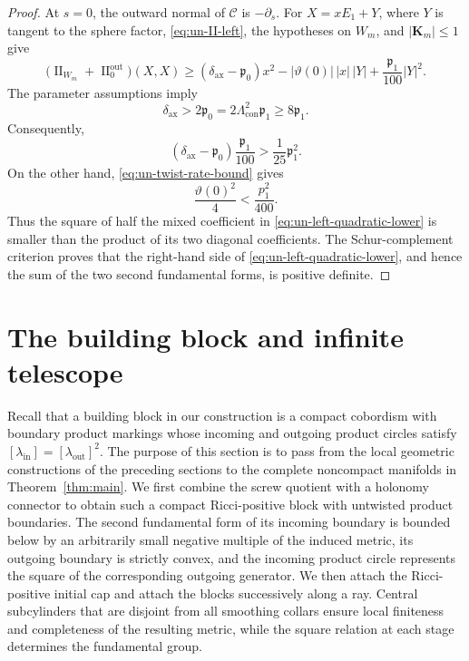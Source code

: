 \documentclass[11pt,reqno]{amsart}
\theoremstyle{definition}
\numberwithin{equation}{section}
\DeclareMathOperator{\II}{II}
\begin{document}
\begin{proof}
At \(s=0\), the outward normal of $\mathcal C$ is \(-\partial_s\).
For \(X=xE_1+Y\), where \(Y\) is tangent to the sphere factor,
\eqref{eq:un-II-left}, the hypotheses on \(W_m\), and
\(|\mathbf K_m|\le1\) give
\begin{equation}
 \bigl(\II_{W_m}+\II^{\mathrm{out}}_0\bigr)(X,X)
 \ge
 (\delta_{\mathrm{ax}}-\mathfrak p_0)x^2
 -|\vartheta(0)|\,|x|\,|Y|
 +\frac{\mathfrak p_1}{100}|Y|^2.
 \label{eq:un-left-quadratic-lower}
\end{equation}
The parameter assumptions imply
\[
 \delta_{\mathrm{ax}}>2\mathfrak p_0
 =2\Lambda_{\mathrm{con}}^2\mathfrak p_1
 \ge8\mathfrak p_1.
\]
Consequently,
\[
 (\delta_{\mathrm{ax}}-\mathfrak p_0)
 \frac{\mathfrak p_1}{100}
 >\frac{1}{25}\mathfrak p_1^2.
\]
On the other hand, \eqref{eq:un-twist-rate-bound} gives
\[
 \frac{\vartheta(0)^2}{4}
 <
 \frac{p_1^2}{400}.
\]
Thus the square of half the mixed coefficient in
\eqref{eq:un-left-quadratic-lower} is smaller than the product of its
two diagonal coefficients.  The Schur-complement criterion proves that
the right-hand side of \eqref{eq:un-left-quadratic-lower}, and hence the
sum of the two second fundamental forms, is positive definite.
\end{proof}


\section{The building block and infinite telescope}
\label{sec:infinite-telescope}

Recall that a building block in our construction is a compact cobordism with boundary
product markings whose incoming and outgoing product circles satisfy
$[\lambda_{\mathrm{in}}]=[\lambda_{\mathrm{out}}]^2$.  The purpose of
this section is to pass from the local geometric
constructions of the preceding sections to the complete noncompact
manifolds in Theorem~\ref{thm:main}.  We first combine the screw quotient
with a holonomy connector to obtain such a compact Ricci-positive block with untwisted
product boundaries.  The second fundamental form of its incoming
boundary is bounded below by an arbitrarily small negative multiple of
the induced metric, its outgoing boundary is strictly convex, and the
incoming product circle represents the square of the corresponding
outgoing generator.  We then attach the Ricci-positive initial cap and
attach the blocks successively along a ray.  Central subcylinders that
are disjoint from all smoothing collars ensure local finiteness and completeness of
the resulting metric, while the square relation at each stage
determines the fundamental group.
\end{document}
